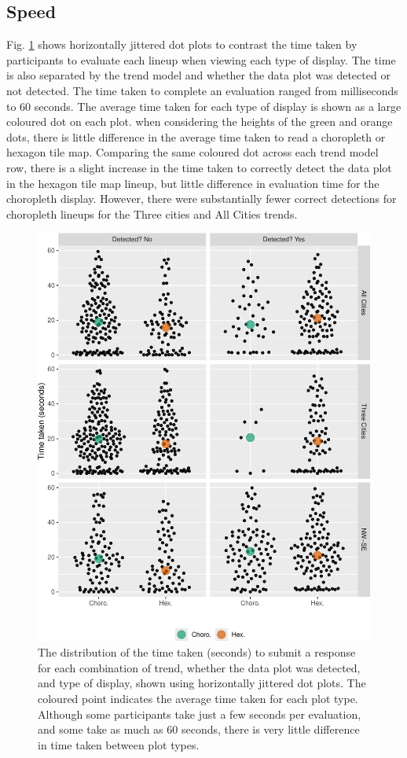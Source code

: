 \documentclass[times, doublespace]{anzsauth}
\begin{document}
\subsection{Speed}\label{speed}

Fig. \ref{fig:beeswarm} shows horizontally jittered dot plots to
contrast the time taken by participants to evaluate each lineup when
viewing each type of display. The time is also separated by the trend model
and whether the data plot was detected or not detected. The time taken
to complete an evaluation ranged from milliseconds to 60 seconds. The
average time taken for each type of display is shown as a large coloured dot
on each plot. when considering the heights of the green and orange dots,
there is little difference in the average time taken to read a
choropleth or hexagon tile map. Comparing the same coloured dot across
each trend model row, there is a slight increase in the time taken to
correctly detect the data plot in the hexagon tile map lineup, but
little difference in evaluation time for the choropleth display.
However, there were substantially fewer correct detections for choropleth
lineups for the Three cities and All Cities trends.

\begin{figure}
\includegraphics[width=1\linewidth]{paper_files/figure-latex/beeswarm-1} \caption{The distribution of the time taken (seconds) to submit a response for each combination of trend, whether the data plot was detected, and type of display, shown using horizontally jittered dot plots. The coloured point indicates the average time taken for each plot type. Although some participants take just a few seconds per evaluation, and some take as much as 60 seconds, there is very little difference in time taken between plot types.}\label{fig:beeswarm}
\end{figure}
\end{document}
